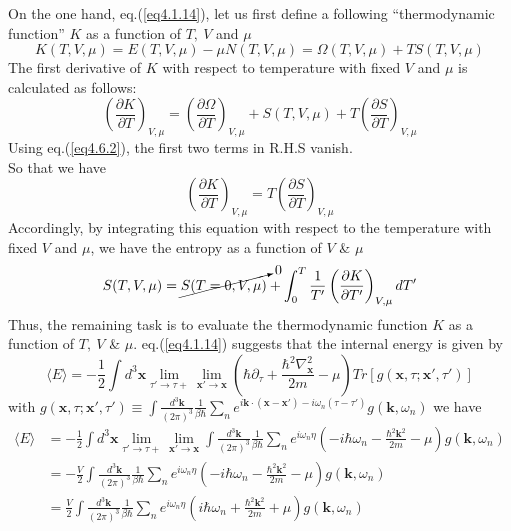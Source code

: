 On the one hand, eq.(\ref{eq4.1.14}), let us first define a following ``thermodynamic function'' $K$ as a function of $T,\ V$ and $\mu$
\begin{equation}
K(T,V,\mu)=E(T,V,\mu)-\mu N(T,V,\mu)=\Omega(T,V,\mu)+TS(T,V,\mu)
\end{equation}
The first derivative of $K$ with respect to temperature with fixed $V$ and $\mu$ is calculated as follows:
\[
\left( \frac{\partial K}{\partial T}\right)_{V,\mu}=\left( \frac{\partial \Omega}{\partial T}\right)_{V,\mu}+S(T,V,\mu)+T\left( \frac{\partial S}{\partial T}\right)_{V,\mu}
\]
Using eq.(\ref{eq4.6.2}), the first two terms in R.H.S vanish.\\
So that we have
\begin{equation}
\left( \frac{\partial K}{\partial T}\right)_{V,\mu}=T\left( \frac{\partial S}{\partial T}\right)_{V,\mu}
\end{equation}
Accordingly, by integrating this equation with respect to the temperature with fixed $V$ and $\mu$, we have the entropy as a function of $V$ \& $\mu$
\begin{equation}
S(T,V,\mu)=\cancelto{0}{S(T=0,V,\mu)}+\int_0^T\frac{1}{T'}\left( \frac{\partial K}{\partial T'}\right)_{V,\mu} dT'
\end{equation}
Thus, the remaining task is to evaluate the thermodynamic function $K$ as a function of $T,\ V$ \& $\mu$.
eq.(\ref{eq4.1.14}) suggests that the internal energy is given by
\[
\langle E \rangle=-\frac{1}{2}\int d^3\mathbf{x} \lim_{\tau'\to \tau+} \lim_{\mathbf{x}'\to\mathbf{x}}\left(\hbar \partial_\tau +\frac{\hbar^2\nabla^2_\mathbf{x}}{2m}-\mu\right) Tr[g(\mathbf{x},\tau;\mathbf{x}',\tau')]
\]
with $g(\mathbf{x},\tau;\mathbf{x}',\tau')\equiv\int \frac{d^3\mathbf{k}}{(2\pi)^3}\frac{1}{\beta\hbar}\sum_n e^{i\mathbf{k}\cdot(\mathbf{x}-\mathbf{x}')-i\omega_n(\tau-\tau')}g(\mathbf{k},\omega_n)$
we have 
\begin{equation}\label{eq4.6.9}
\begin{aligned}
\langle E \rangle&=-\frac{1}{2}\int d^3 \mathbf{x} \lim_{\tau'\to \tau+} \lim_{\mathbf{x}'\to\mathbf{x}} \int \frac{d^3 \mathbf{k}}{(2\pi)^3} \frac{1}{\beta\hbar} \sum_n e^{i\omega_n \eta}\left(-i\hbar\omega_n-\frac{\hbar^2\mathbf{k}^2}{2m}-\mu\right)g(\mathbf{k},\omega_n)\\
&=-\frac{V}{2} \int \frac{d^3 \mathbf{k}}{(2\pi)^3} \frac{1}{\beta\hbar} \sum_n e^{i\omega_n \eta}\left(-i\hbar\omega_n-\frac{\hbar^2\mathbf{k}^2}{2m}-\mu\right)g(\mathbf{k},\omega_n)\\
&=\frac{V}{2} \int \frac{d^3 \mathbf{k}}{(2\pi)^3} \frac{1}{\beta\hbar} \sum_n e^{i\omega_n \eta}\left(i\hbar\omega_n+\frac{\hbar^2\mathbf{k}^2}{2m}+\mu\right)g(\mathbf{k},\omega_n)
\end{aligned}
\end{equation}

